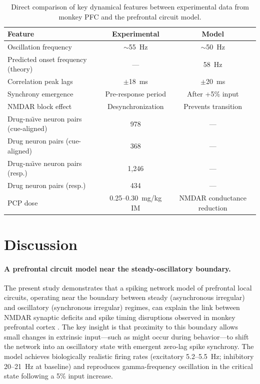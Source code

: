 \documentclass[10pt]{article}
\begin{document}
\begin{table}[htbp]
\centering
\caption{Direct comparison of key dynamical features between experimental
data from monkey PFC \citep{zick2018blocking} and the prefrontal circuit
model.}
\label{tab:comparison}
\begin{tabular}{lcc}
\toprule
Feature & Experimental & Model \\
\midrule
Oscillation frequency & $\sim$55~Hz & $\sim$50~Hz \\
Predicted onset frequency (theory) & --- & 58~Hz \\
Correlation peak lags & $\pm$18~ms & $\pm$20~ms \\
Synchrony emergence & Pre-response period & After +5\% input \\
NMDAR block effect & Desynchronization & Prevents transition \\
Drug-na\"{\i}ve neuron pairs (cue-aligned) & 978 & --- \\
Drug neuron pairs (cue-aligned) & 368 & --- \\
Drug-na\"{\i}ve neuron pairs (resp.) & 1{,}246 & --- \\
Drug neuron pairs (resp.) & 434 & --- \\
PCP dose & 0.25--0.30~mg/kg IM & NMDAR conductance reduction \\
\bottomrule
\end{tabular}
\end{table}

\section{Discussion}

\paragraph{A prefrontal circuit model near the steady-oscillatory boundary.}
The present study demonstrates that a spiking network model of prefrontal
local circuits, operating near the boundary between steady (asynchronous
irregular) and oscillatory (synchronous irregular) regimes, can explain the
link between NMDAR synaptic deficits and spike timing disruptions observed in
monkey prefrontal cortex \citep{zick2018blocking}. The key insight is that
proximity to this boundary allows small changes in extrinsic input---such as
might occur during behavior---to shift the network into an oscillatory state
with emergent zero-lag spike synchrony. The model achieves biologically
realistic firing rates (excitatory 5.2--5.5~Hz; inhibitory 20--21~Hz at
baseline) and reproduces gamma-frequency oscillation in the critical state
following a 5\% input increase.
\end{document}
